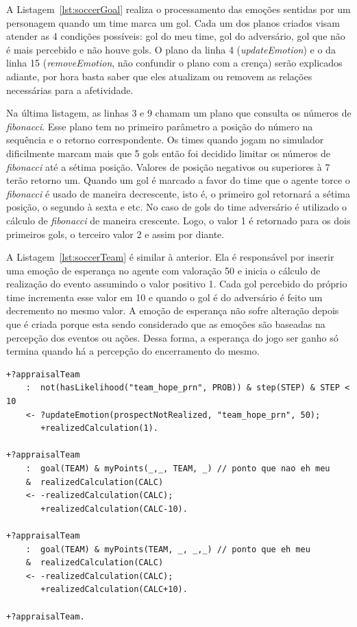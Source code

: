 A Listagem~\ref{lst:soccerGoal} realiza o processamento das emoções sentidas
por um personagem quando um time marca um gol. Cada um dos planos criados
visam atender as 4 condições possíveis: gol do meu time, gol do adversário,
gol que não é mais percebido e não houve gols. O plano da
linha 4 (\emph{updateEmotion}) e o da linha 15 (\emph{removeEmotion}, não
confundir o plano com a crença) serão explicados adiante, por hora basta saber
que eles atualizam ou removem as relações necessárias para a afetividade.

Na última listagem, as linhas 3 e 9 chamam um plano que consulta os números de
\emph{fibonacci}. Esse plano tem no primeiro parâmetro a posição do número na
sequência e o retorno correspondente.
Os times quando jogam no simulador dificilmente
marcam mais que 5 gols então foi decidido limitar os números de
\emph{fibonacci} até a sétima posição. Valores de posição negativos ou
superiores à 7 terão retorno um. Quando um gol é marcado
a favor do time que o agente torce o \emph{fibonacci} é usado de maneira
decrescente, isto é, o primeiro gol retornará a sétima posição, o segundo à
sexta e etc. No caso de gols do time adversário é utilizado o cálculo de
\emph{fibonacci} de maneira crescente. Logo, o valor 1 é retornado para os
dois primeiros gols, o terceiro valor 2 e assim por diante.

A Listagem~\ref{lst:soccerTeam} é similar à anterior. Ela é responsável por inserir uma
emoção de esperança no agente com valoração 50 e inicia o cálculo de
realização do evento assumindo o valor positivo 1. Cada gol percebido
do próprio time incrementa esse valor em 10 e quando o gol é do
adversário é feito um decremento no mesmo valor. A emoção de esperança não
sofre alteração depois que é criada porque esta sendo considerado que as
emoções são baseadas na percepção dos eventos ou ações. Dessa forma, a esperança do
jogo ser ganho só termina quando há a percepção do encerramento do mesmo.

\begin{center}
    \begin{minipage}{130mm}
	\lstset{linewidth=130mm}
	\begin{lstlisting}[frame=trbl,
caption=Parte do código do agente referente ao andamento do jogo,
label=lst:soccerTeam]
+?appraisalTeam
    :  not(hasLikelihood("team_hope_prn", PROB)) & step(STEP) & STEP < 10
    <- ?updateEmotion(prospectNotRealized, "team_hope_prn", 50);
       +realizedCalculation(1).

+?appraisalTeam
    :  goal(TEAM) & myPoints(_,_, TEAM, _) // ponto que nao eh meu
    &  realizedCalculation(CALC)
    <- -realizedCalculation(CALC);
       +realizedCalculation(CALC-10).

+?appraisalTeam
    :  goal(TEAM) & myPoints(TEAM, _, _,_) // ponto que eh meu
    &  realizedCalculation(CALC)
    <- -realizedCalculation(CALC);
       +realizedCalculation(CALC+10).

+?appraisalTeam.
	\end{lstlisting}
    \end{minipage}
\end{center}

